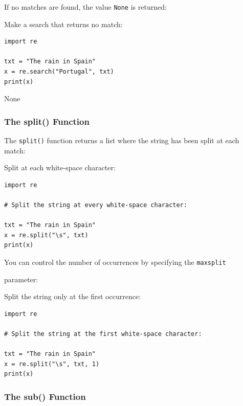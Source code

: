 \documentclass[12pt,a4paper]{article}
\newcommand{\code}[1]{%
	\colorbox{backcolour}{\lstinline{#1}}%
}
\begin{document}
If no matches are found, the value \code{None} is returned:

\begin{ebox}
Make a search that returns no match:
	\begin{lstlisting}
import re

txt = "The rain in Spain"
x = re.search("Portugal", txt)
print(x)
	\end{lstlisting}
\tcblower
	\begin{vercode}
None
	\end{vercode}
\end{ebox}
\subsubsection{The split() Function}

The \code{split()} function returns a list where the string has been split at
each match:

\begin{ebox}
Split at each white-space character:
	\begin{lstlisting}
import re

# Split the string at every white-space character:

txt = "The rain in Spain"
x = re.split("\s", txt)
print(x)
	\end{lstlisting}
\tcblower
	\begin{vercode}
	\end{vercode}
\end{ebox}

You can control the number of occurrences by specifying the \code{maxsplit}
parameter:

\begin{ebox}
Split the string only at the first occurrence:
	\begin{lstlisting}
import re

# Split the string at the first white-space character:

txt = "The rain in Spain"
x = re.split("\s", txt, 1)
print(x)
	\end{lstlisting}
\tcblower
	\begin{vercode}
	\end{vercode}
\end{ebox}
\subsubsection{The sub() Function}
\end{document}
